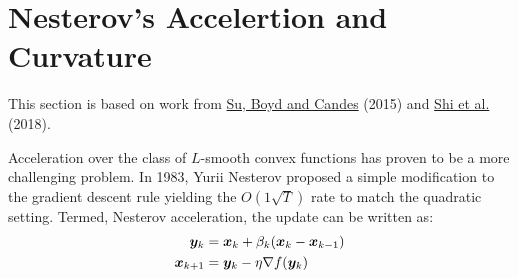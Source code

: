 \documentclass[11pt]{article}
\begin{document}

















\section{Nesterov's Accelertion and Curvature}

This section is based on work from \href{https://arxiv.org/pdf/1503.01243}{Su, Boyd and Candes} (2015) and \href{https://arxiv.org/pdf/1810.08907}{Shi et al.} (2018).


Acceleration over the class of $L$-smooth convex functions has proven to be a more challenging 
problem. In 1983, Yurii Nesterov proposed a simple modification to the gradient descent rule yielding the $O(1\sqrt{T})$ rate to match the quadratic setting. Termed, Nesterov acceleration, the update can be written as:
\begin{align*}
    \bm{y}_k   &= \bm{x}_k + \beta_k (\bm{x}_k - \bm{x}_{k-1}) \\
    \bm{x}_{k+1} &= \bm{y}_k - \eta \nabla f(\bm{y}_k)
\end{align*}
\end{document}
